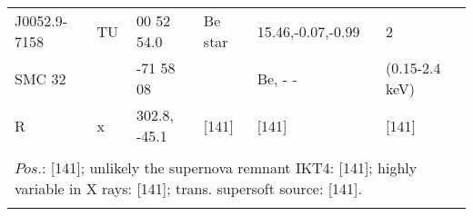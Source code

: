 \documentclass{aa}
\begin{document}
\begin{table*}[h]
\begin{tabular}{p{2.5cm}p{1cm}p{1.8cm}p{2.3cm}p{3.3cm}p{2.0cm}p{2.2cm}}
\hline
\noalign{\smallskip}
J0052.9-7158  &  TU       &  00 52 54.0      & Be star     & 15.46,-0.07,-0.99   &  2                            &   \\
 SMC 32           &              &        -71 58 08  &                    &  Be, - -                     & (0.15-2.4 keV)       &   \\           
R                        &       x     & 302.8, -45.1     &  [141]        &    [141]                     &     [141]                    &   \\
  
\\
\multicolumn{7}{p{17.5cm}}{
$Pos$.: [141]; unlikely the supernova remnant IKT4: [141]; highly variable in X rays: [141]; trans. supersoft source: [141].}\\

\noalign{\smallskip}
\hline
\end{tabular}
\end{table*}
\end{document}
